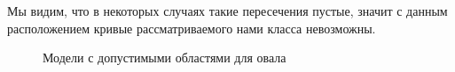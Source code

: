 \documentclass[14pt]{article}
\begin{document}
\begin{figure}[H]
\caption{}
\label{fig:intersection_of_fields}
\end{figure}

Мы видим, что в некоторых случаях такие пересечения пустые, значит с данным расположением кривые рассматриваемого нами класса невозможны.

\begin{figure}[H]
\caption{Модели с допустимыми областями для овала}
\label{fig:curves_with_ovals}
\end{figure}
\end{document}
